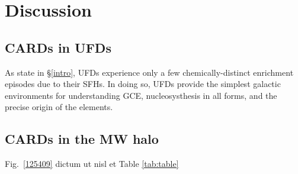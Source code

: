 \section{Discussion}
\label{diss}


\subsection{CARDs in UFDs}
\label{ufdcards}

As state in \S\ref{intro}, UFDs experience only a few chemically-distinct enrichment episodes due to their SFHs. In doing so, UFDs provide the simplest galactic environments for understanding GCE, nucleosysthesis in all forms, and the precise origin of the elements. 

\subsection{CARDs in the MW halo}
\label{ufdcards}



Fig.~\ref{125409} dictum ut nisl et Table \ref{tab:table}
